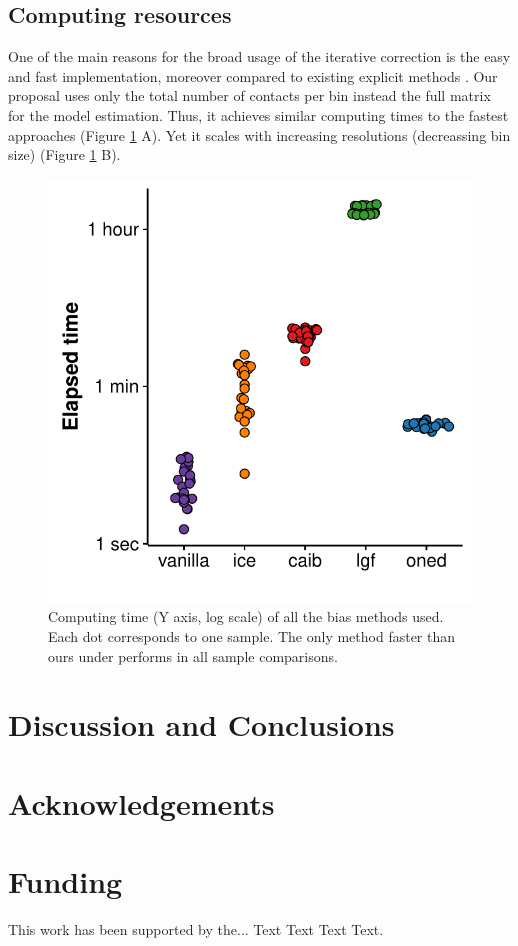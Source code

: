 \documentclass{bioinfo}
\begin{document}
\subsection{Computing resources}

One of the main reasons for the broad usage of the iterative correction \citep{imakaev2012iterative} is the easy and fast implementation, moreover compared to existing explicit methods \citep{servant2012hitc}. Our proposal uses only the total number of contacts per bin instead the full matrix for the model estimation. Thus, it achieves similar computing times to the fastest approaches (Figure \ref{fig:times} A). Yet it scales with increasing resolutions (decreassing bin size) (Figure \ref{fig:times} B).

\begin{figure}
	\centerline{\includegraphics[width=.35\textwidth]{img/times_sina_figure5.pdf}}
	\caption{
		Computing time (Y axis, log scale) of all the bias methods used. Each dot corresponds to one sample. The only method faster than ours under performs in all sample comparisons.
	}\label{fig:times}
\end{figure}




\section{Discussion and Conclusions}

\section*{Acknowledgements}


\section*{Funding}

This work has been supported by the... Text Text  Text Text.\vspace*{-12pt}



\end{document}
